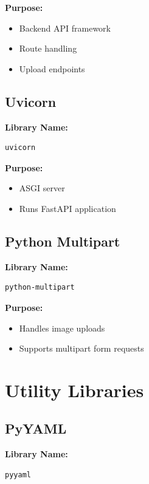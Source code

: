 \documentclass[12pt]{article}
\begin{document}
\textbf{Purpose:}
\begin{itemize}
    \item Backend API framework
    \item Route handling
    \item Upload endpoints
\end{itemize}

\subsection{Uvicorn}

\textbf{Library Name:}
\begin{verbatim}
uvicorn
\end{verbatim}

\textbf{Purpose:}
\begin{itemize}
    \item ASGI server
    \item Runs FastAPI application
\end{itemize}

\subsection{Python Multipart}

\textbf{Library Name:}
\begin{verbatim}
python-multipart
\end{verbatim}

\textbf{Purpose:}
\begin{itemize}
    \item Handles image uploads
    \item Supports multipart form requests
\end{itemize}

\section{Utility Libraries}

\subsection{PyYAML}

\textbf{Library Name:}
\begin{verbatim}
pyyaml
\end{verbatim}
\end{document}
